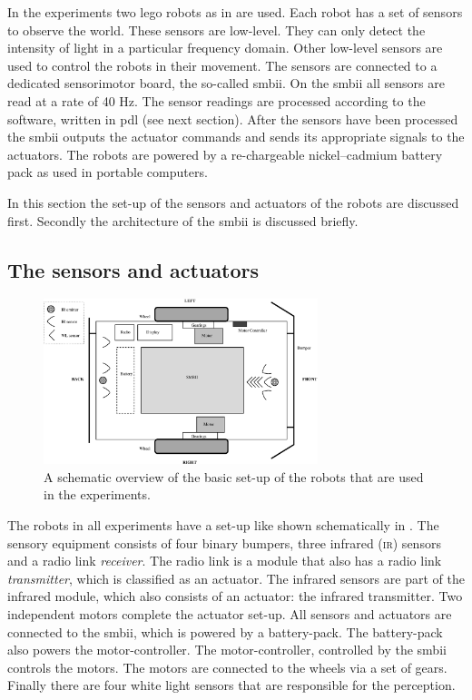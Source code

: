 In the experiments two {\sc lego} robots as in  are used. Each robot has a set of sensors to observe the world. These sensors are low-level. They can only detect the intensity of light in a particular frequency domain. Other low-level sensors are used to control the robots in their movement. The sensors are connected to a dedicated sensorimotor board, the so-called {\sc smbii}. On the {\sc smbii} all sensors are read at a rate of 40 Hz. The sensor readings are processed according to the software, written in {\sc pdl} (see next section). After the sensors have been processed the {\sc smbii} outputs the actuator commands and sends its appropriate signals to the actuators. The robots are powered by a re-chargeable nickel--cadmium battery pack as used in portable computers.

In this section the set-up of the sensors and actuators of the robots are discussed first. Secondly the architecture of the {\sc smbii} is discussed briefly.

\subsection{The sensors and actuators}\label{s:robots:sensors}

\begin{figure}[t]
\centerline{\includegraphics[width=8cm]{robots//schema_robots_exp2.eps}}
\caption{A schematic overview of the basic set-up of the robots that are used in the experiments.}
\label{f:robots:robots_general}
\end{figure}

The robots in all experiments have a set-up like shown schematically in . The sensory equipment consists of four binary bumpers, three infrared {\scshape (ir)} sensors and a radio link {\em receiver}. The radio link is a module that also has a radio link {\em transmitter}, which is classified as an actuator. The infrared sensors are part of the infrared module, which also consists of an actuator: the infrared transmitter. Two independent motors complete the actuator set-up. All sensors and actuators are connected to the {\sc smbii}, which is powered by a battery-pack. The battery-pack also powers the motor-controller. The motor-controller, controlled by the {\sc smbii} controls the motors. The motors are connected to the wheels via a set of gears. Finally there are four white light sensors that are responsible for the perception.

